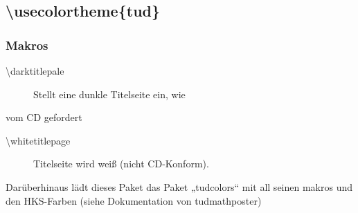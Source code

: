 \documentclass[presentation,t]{beamer}
\begin{document}
\subsection{\textbackslash usecolortheme\{tud\}}
\label{sec-2-4}
\begin{frame}
\frametitle{Makros}
\label{sec-2-4-1}

\begin{description}
\item[\textbackslash darktitlepale] Stellt eine dunkle Titelseite ein, wie
\end{description}
vom CD gefordert
\begin{description}
\item[\textbackslash whitetitlepage] Titelseite wird weiß (nicht CD-Konform).
\end{description}

Darüberhinaus lädt dieses Paket das Paket „tudcolors“ mit all seinen
makros und den HKS-Farben (siehe Dokumentation von tudmathposter)
\end{frame}
\end{document}
